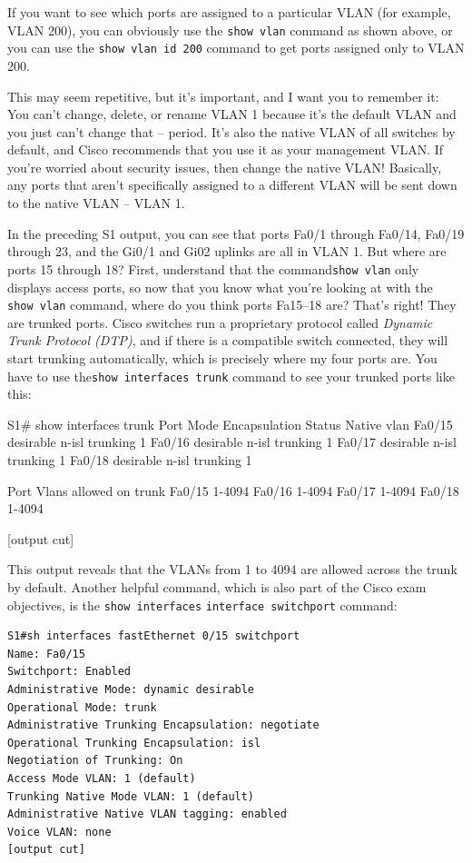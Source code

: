 \documentclass[b5paper,11pt]{memoir}
\begin{document}
If you want to see which ports are assigned to a particular VLAN (for
example, VLAN 200), you can obviously use the \texttt{show\ vlan}
command as shown above, or you can use the \texttt{show\ vlan\ id\ 200}
command to get ports assigned only to VLAN 200.

This may seem repetitive, but it's important, and I want you to remember
it: You can't change, delete, or rename VLAN 1 because it's the default
VLAN and you just can't change that -- period. It's also the native VLAN
of all switches by default, and Cisco recommends that you use it as your
management VLAN. If you're worried about security issues, then change
the native VLAN! Basically, any ports that aren't specifically assigned
to a different VLAN will be sent down to the native VLAN -- VLAN 1.

In the preceding S1 output, you can see that ports Fa0/1 through Fa0/14,
Fa0/19 through 23, and the Gi0/1 and Gi02 uplinks are all in VLAN 1. But
where are ports 15 through 18? First, understand that the
command\texttt{show\ vlan} only displays access ports, so now that you
know what you're looking at with the \texttt{show\ vlan} command, where
do you think ports Fa15--18 are? That's right! They are trunked ports.
Cisco switches run a proprietary protocol called \emph{Dynamic Trunk
Protocol (DTP)}, and if there is a compatible switch connected, they
will start trunking automatically, which is precisely where my four
ports are. You have to use the\texttt{show\ interfaces\ trunk} command
to see your trunked ports like this:

\begin{cli}
S1# show interfaces trunk
Port        Mode             Encapsulation  Status        Native vlan
Fa0/15      desirable        n-isl          trunking      1
Fa0/16      desirable        n-isl          trunking      1
Fa0/17      desirable        n-isl          trunking      1
Fa0/18      desirable        n-isl          trunking      1
 
Port        Vlans allowed on trunk
Fa0/15      1-4094
Fa0/16      1-4094
Fa0/17      1-4094
Fa0/18      1-4094
 
[output cut]
\end{cli}

This output reveals that the VLANs from 1 to 4094 are allowed across the trunk by default.
Another helpful command, which is also part of the Cisco exam
objectives, is the \texttt{show\ interfaces}
\texttt{interface}\texttt{\ switchport} command:

\begin{verbatim}
S1#sh interfaces fastEthernet 0/15 switchport
Name: Fa0/15
Switchport: Enabled
Administrative Mode: dynamic desirable
Operational Mode: trunk
Administrative Trunking Encapsulation: negotiate
Operational Trunking Encapsulation: isl
Negotiation of Trunking: On
Access Mode VLAN: 1 (default)
Trunking Native Mode VLAN: 1 (default)
Administrative Native VLAN tagging: enabled
Voice VLAN: none
[output cut]
\end{verbatim}
\end{document}
